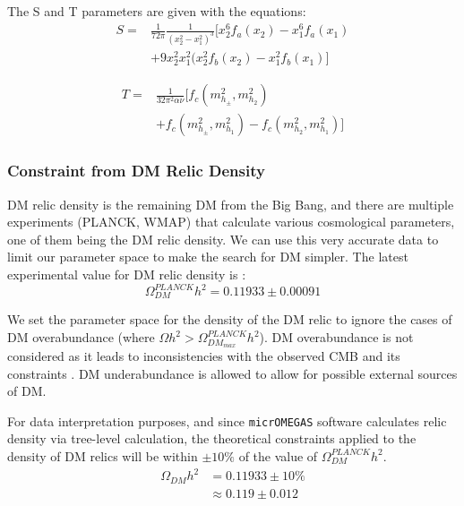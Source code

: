 \documentclass[12pt]{article}
\begin{document}
The S and T parameters are given with the equations:
\begin{equation}
    \begin{split}
           S =& \frac{1}{72\pi}\frac{1}{(x^2_2 - x^2_1)^3}[x^6_2f_a(x_2)-x^6_1f_a(x_1)
            \\&+ 9x_2^2x_1^2(x_2^2f_b(x_2)-x^2_1f_b(x_1)] 
    \end{split}
    \label{eqn:S}
\end{equation}

\begin{equation}
    \begin{split}
        T = &\frac{1}{32\pi^2\alpha\nu}[f_c(m^2_{h_\pm},m^2_{h_2})
            \\&+ f_c(m^2_{h_\pm},m^2_{h_1}) - f_c(m^2_{h_2},m^2_{h_1})]
    \end{split}
    \label{eqn:T}
\end{equation}

\subsubsection{Constraint from DM Relic Density}
\label{sec:relic density}
DM relic density is the remaining DM from the Big Bang, and there are multiple experiments (PLANCK, WMAP) that calculate various cosmological parameters, one of them being the DM relic density. We can use this very accurate data to limit our parameter space to make the search for DM simpler. The latest experimental value for DM relic density is  \cite{Planck:2018vyg}:
\begin{equation}
    \Omega ^{PLANCK}_{DM} h^2 = 0.11933 \pm 0.00091
\end{equation}

We set the parameter space for the density of the DM relic to ignore the cases of DM overabundance (where $\Omega h^2 > \Omega^{PLANCK}_{DM_{max}}h^2$). DM overabundance is not considered as it leads to inconsistencies with the observed CMB and its constraints \cite{Croon_2024, Zavala_2010}. DM underabundance is allowed to allow for possible external sources of DM.

For data interpretation purposes, and since \verb|micrOMEGAS| software calculates relic density via tree-level calculation, the theoretical constraints applied to the density of DM relics will be within $\pm10\%$ of the value of $\Omega ^{PLANCK}_{DM} h^2$.
\begin{equation}
    \begin{split}
        \Omega_{DM} h^2 &= 0.11933 \pm 10\% \\
        &\approx 0.119 \pm 0.012
    \end{split}
    \label{eqn:DM relic density value}
\end{equation}
\end{document}
